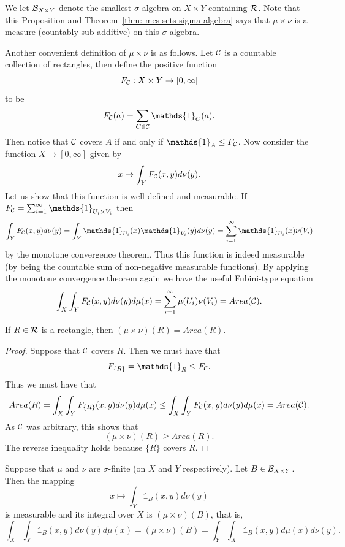 \documentclass[twoside, a4paper, 10pt]{amsart}
\begin{document}
We let $\mathcal{B}_{X \times Y}$ denote the smallest $\sigma$-algebra on $X \times Y$ containing $\mathcal{R}$. Note that this Proposition and Theorem~\ref{thm: mes sets sigma algebra} says that $\mu \times \nu$ is a measure (countably sub-additive) on this $\sigma$-algebra.

Another convenient definition of $\mu \times \nu$ is as follows. Let $\mathcal{C}$ is a countable collection of rectangles, then define the positive function $$F_{\mathcal{C}} :X\times Y \to [0,\infty]$$ to be $$F_{\cC}(a) = \sum_{C \in \cC} \mathds{1}_{C}(a).$$ Then notice that $\mathcal{C}$ covers $A$ if and only if $\mathds{1}_{A} \leq F_{\cC}$. Now consider the function $X \to [0,\infty]$
given by $$x \mapsto \int_{Y} F_{\mathcal{C}}(x,y) d\nu(y).$$ Let us show that this function is well defined and measurable. If $F_{\cC} = \sum_{i=1}^{\infty} \mathds{1}_{U_i \times V_i}$ then $$\int_{Y} F_{\cC}(x,y) d\nu(y) = \int_{Y} \mathds{1}_{U_i}(x)\mathds{1}_{V_i}(y) d \nu(y) = \sum_{i=1}^{\infty}\mathds{1}_{U_i}(x) \nu(V_i)$$ by the monotone convergence theorem. Thus this function is indeed measurable (by being the countable sum of non-negative measurable functions). By applying the monotone convergence theorem again we have the useful Fubini-type equation $$\int_X \int_Y F_{\mathcal{C}}(x,y) d\nu(y) d\mu(x) = \sum_{i=1}^{\infty} \mu(U_i)\nu(V_i) = Area(\mathcal{C}).$$

\begin{prop} If $R \in \mathcal{R}$ is a rectangle, then $(\mu \times \nu)(R) = Area(R)$.

\end{prop}

\begin{proof} Suppose that $\mathcal{C}$ covers $R$. Then we must have that $$F_{\{R\}} = \mathds{1}_{R} \leq F_{\cC}.$$ Thus we must have that $$Area(R) = \int_{X}\int_{Y}F_{\{R\}} (x,y) d\nu(y)d\mu(x) \leq \int_{X}\int_{Y} F_{\mathcal{C}}(x,y) d\nu(y)d\mu(x) = Area(\mathcal{C}).$$ As $\mathcal{C}$ was arbitrary, this shows that $$(\mu \times \nu) (R) \geq Area(R).$$ The reverse inequality holds because $\{R\}$ covers $R$. \end{proof}

\begin{thm} Suppose that $\mu$ and $\nu$ are $\sigma$-finite (on $X$ and $Y$ respectively). Let $B \in \mathcal{B}_{X \times Y}$. Then the mapping $$x \mapsto \int_{Y} \mathds{1}_B(x,y) d\nu(y)$$ is measurable and its integral over $X$ is $(\mu \times \nu)(B)$, that is, $$\int_{X} \int_{Y} \mathds{1}_B(x,y) d\nu(y) d\mu(x) = (\mu \times \nu)(B) = \int_{Y} \int_{X} \mathds{1}_B(x,y) d\mu(x) d\nu(y) .$$

\end{thm}
\end{document}
